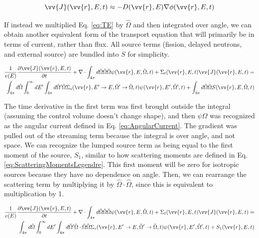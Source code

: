 \documentclass[10pt]{article}
\newcommand{\beq}{\begin{equation}}
\newcommand{\eeq}{\end{equation}}
\newcommand{\beqa}{\begin{equation}\begin{aligned}}
\newcommand{\eeqa}{\end{aligned}\end{equation}}
\newcommand{\hO}{\hat{\Omega}}
\newcommand{\spa}{(\vv{r}, E, \hO, t)}
\newcommand{\spas}{(\vv{r},E,t)}
\newcommand{\spap}{(\vv{r}, E', \hO',t)}
\newcommand{\spang}{(\vv{r},E'\rightarrow E, \hO'\rightarrow\hO,t)}
\begin{document}
\begin{flushleft}
\beq
\vv{J}\spas\approx-D(\vv{r},E)\nabla\phi\spas
\eeq

If instead we multiplied Eq. \ref{eq:TE} by \(\hO\) and then integrated over angle, we can obtain another equivalent form of the transport equation that will primarily be in terms of current, rather than flux. All source terms (fission, delayed neutrons, and external source) are bundled into \(S\) for simplicity. 

\beqa
\label{eq:TEAngleAngleIntegrated}
\frac{1}{v(E)} \frac{\partial\vv{J}\spas}{\partial t} +
 \nabla\cdot \int_{4\pi}^{} d\hO  \hO  \hO  \psi\spa  + 
 \Sigma_t\spas\vv{J}\spas = \\
 \int_{4\pi}^{} d\hO\int_{0}^{\infty}dE' \int_{4\pi}^{ } d\hO  ' \hO  \Sigma_s\spang\psi\spap + \int_{4\pi}^{} d\hO  \hO  S\spa\\
\eeqa

The time derivative in the first term was first brought outside the integral (assuming the control volume doesn't change shape), and then \(\psi\hO  \) was recognized as the angular current defined in Eq. \ref{eq:AngularCurrent}. The gradient was pulled out of the streaming term because the integral is over angle, and not space. We can recognize the lumped source term as being equal to the first moment of the source, \(S_1\), similar to how scattering moments are defined in Eq. \ref{eq:ScatteringMomentsLegendre}. This first moment will be zero for isotropic sources because they have no dependence on angle. Then, we can rearrange the scattering term by multiplying it by \(\hO  \cdot\hO  \), since this is equivalent to multiplication by 1. 

\beqa
\label{eq:TEAngleAngleIntegrated}
\frac{1}{v(E)} \frac{\partial\vv{J}\spas}{\partial t} +
 \nabla\cdot \int_{4\pi}^{} d\hO   \hO  \hO  \psi\spa  + 
 \Sigma_t\spas\vv{J}\spas = \\
 \int_{4\pi}^{} d\hO   \int_{0}^{\infty}dE' \int_{4\pi}^{ } d\hO  ' \hO  \cdot\hO   \hO  \Sigma_s\spang\psi\spap + S_1\spas\\
\eeqa

\end{flushleft}
\end{document}
